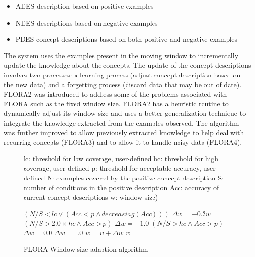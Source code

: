 \begin{itemize}
 \item ADES description based on positive examples
 \item NDES descriptions based on negative examples
 \item PDES concept descriptions based on both positive and negative examples
\end{itemize} 
  The system uses the examples present in the moving window to
incrementally update the knowledge about the concepts. The update of the concept descriptions
involves two processes: a learning process (adjust concept description based on the new data) and
a forgetting process (discard data that may be out of date).
FLORA2 was introduced to address some of the problems associated with FLORA such as
the fixed window size. FLORA2 has a heuristic routine to dynamically adjust its window size
and uses a better generalization technique to integrate the knowledge extracted from the examples
observed. %
The algorithm was further improved to allow previously extracted knowledge to help
deal with recurring concepts (FLORA3) and to allow it to handle noisy data (FLORA4).
\ENDOMIT
\BEGINOMIT
\begin{figure}[h]
\begin{codebox}
\zi lc: threshold for low coverage, user-defined
\zi hc: threshold for high coverage, user-defined
\zi p: threshold for acceptable accuracy, user-defined
\zi N: examples covered by the positive concept description
\zi S: number of conditions in the positive description
\zi Acc: accuracy of current concept descriptions
\zi w: window size)

\li \If $(N/S < lc \vee (Acc < p \wedge decreasing(Acc)))$
\li \Do $\Delta w =- 0.2w$
\li \Else \If $(N/S > 2.0 \times hc \wedge Acc > p)$
\li \Do $\Delta w =- 1.0$
\li \Else \If $(N/S > hc \wedge Acc > p)$
\li \Do $\Delta w = 0.0$
\li \Else
\li \Do $\Delta w = 1.0$ \End \End \End
\li $w = w + \Delta w$
\li \Return $w$
\end{codebox}

\caption{FLORA Window size adaption algorithm}
\label{Fig:Flora}
\end{figure}




